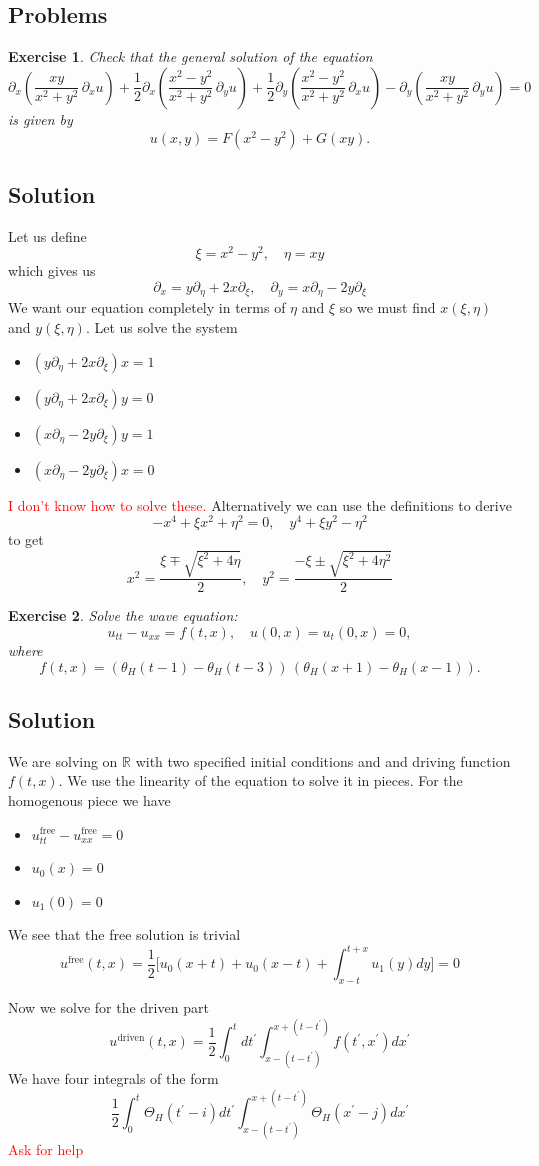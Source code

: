 \documentclass[11pt,a4paper]{article}
\newtheorem*{exercise}{Exercise}
\newcommand{\solution}[1]{
	\subsection*{Solution}
	#1
}
\newcommand{\problems}[1]{
	\subsection*{Problems}
	#1
}
\begin{document}
\problems{
\begin{exercise}
	Check that the general solution of the equation
	\[
	\partial_x\!\left( \frac{xy}{x^2 + y^2} \, \partial_x u \right)
	+ \frac{1}{2}\partial_x\!\left( \frac{x^2 - y^2}{x^2 + y^2} \, \partial_y u \right)
	+ \frac{1}{2}\partial_y\!\left( \frac{x^2 - y^2}{x^2 + y^2} \, \partial_x u \right)
	- \partial_y\!\left( \frac{xy}{x^2 + y^2} \, \partial_y u \right) = 0
	\]
	is given by
	\[
	u(x, y) = F(x^2 - y^2) + G(xy).
	\]
\end{exercise}
\solution{
Let us define
$$
\xi = x^{2}-y^{2},\quad \eta = xy
$$
which gives us 
$$
\partial_{x} = y\partial_{\eta}+2x\partial_{\xi},\quad \partial_{y} = x\partial_{\eta}-2y\partial_{\xi}
$$
We want our equation completely in terms of $\eta$ and $\xi$ so we must find $x(\xi,\eta)$ and $y(\xi,\eta)$.
Let us solve the system
\begin{itemize}
\item $(y\partial_{\eta}+2x\partial_{\xi}) x = 1$
\item $(y\partial_{\eta}+2x\partial_{\xi})y = 0$
\item $(x\partial_{\eta}-2y\partial_{\xi}) y = 1$
\item $(x\partial_{\eta}-2y\partial_{\xi}) x = 0$
\end{itemize}
\textcolor{red}{I don't know how to solve these.} Alternatively we can use the definitions to derive
$$
-x^{4}+\xi x^{2}+\eta^{2} = 0, \quad y^{4}+\xi y^{2} - \eta^{2}
$$
to get
$$
x^{2} = \frac{\xi\mp\sqrt{\xi^{2}+4\eta}}{2},\quad y^{2} = \frac{-\xi\pm\sqrt{\xi^{2}+4\eta^{2}}}{2}
$$
}
\begin{exercise}
	Solve the wave equation:
	\[
	u_{tt} - u_{xx} = f(t, x), \quad u(0, x) = u_t(0, x) = 0,
	\]
	where
	\[
	f(t, x) = (\theta_H(t - 1) - \theta_H(t - 3)) \, (\theta_H(x + 1) - \theta_H(x - 1)).
	\]
\end{exercise}
\solution{We are solving on $\mathbb{R}$ with two specified initial conditions and and driving function $f(t,x)$. We use the linearity of the equation to solve it in pieces. For the homogenous piece we have 
\begin{itemize}
\item $u^{\text{free}}_{tt} - u^{\text{free}}_{xx} = 0$
\item $u_{0}(x) = 0$
\item $u_{1}(0)=0$
\end{itemize}
We see that the free solution is trivial
$$
u^{\text{free}}(t,x) = \frac{1}{2}\big[u_{0}(x+t)+u_{0}(x-t)+ \int_{x-t}^{t+x}u_{1}(y)dy\big]
=0$$
}
Now we solve for the driven part
$$
u^{\text{driven}}(t,x) = \frac{1}{2}\int_{0}^{t}dt^{\prime}\int_{x-(t-t^{\prime})}^{x+(t-t^{\prime})}f(t^{\prime},x^{\prime})dx^{\prime}
$$
We have four integrals of the form
$$
\frac{1}{2}\int_{0}^{t}\Theta_{H}(t^{\prime}-i)dt^{\prime}\int_{x-(t-t^{\prime})}^{x+(t-t^{\prime})}\Theta_{H}(x^{\prime}-j)dx^{\prime}
$$
\textcolor{red}{Ask for help}

}
\end{document}

